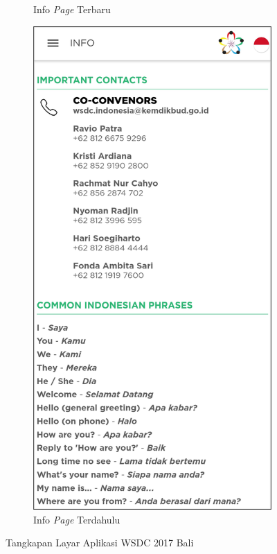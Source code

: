 \begin{figure}[H]
\begin{subfigure}[b]{0.3\textwidth}
         \caption{Info \textit{Page} Terbaru}
         \label{fig:ssInfo}
     \end{subfigure}
     \hspace*{0.5in}
     \begin{subfigure}[b]{0.3\textwidth}
         \centering
         \includegraphics[width=\textwidth]{Gambar/InfoPage.png}
         \caption{Info \textit{Page} Terdahulu}
         \label{fig:ssInfoOld}
     \end{subfigure}
        \caption{Tangkapan Layar Aplikasi WSDC 2017 Bali}
        \label{fig:ssApk1}
\end{figure}



